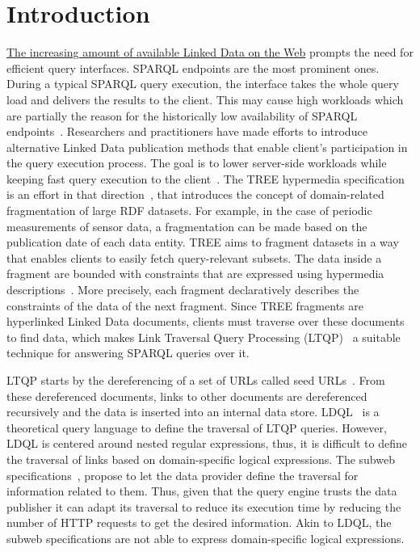 \section{Introduction}



\href{https://lod-cloud.net/#diagram}{The increasing amount of available Linked Data on the Web} prompts the need for efficient query interfaces.
SPARQL endpoints are the most prominent ones.
During a typical SPARQL query execution, the interface takes the whole query load and delivers the results to the client.
This may cause high workloads which are partially the reason for the historically low availability of SPARQL endpoints~\cite{aranda2013}.
Researchers and practitioners have made efforts to introduce alternative Linked Data publication methods that enable client's participation in the query execution process.
The goal is to lower server-side workloads while keeping fast query execution to the client~\cite{Azzam2021}.
The TREE hypermedia specification is an effort in that direction~\cite{ColpaertMaterializedTREE, lancker2021LDS}, that introduces the concept of domain-related fragmentation of large RDF datasets.
For example, in the case of periodic measurements of sensor data, a fragmentation can be made based on the publication date of each data entity.
TREE aims to fragment datasets in a way that enables clients to easily fetch query-relevant subsets.
The data inside a fragment are bounded with constraints that are expressed using hypermedia descriptions~\cite{thomasFieldingPhdThesis}.
More precisely, each fragment declaratively describes the constraints of the data of the next fragment.
Since TREE fragments are hyperlinked Linked Data documents,
clients must traverse over these documents to find data,
which makes Link Traversal Query Processing (LTQP)~\cite{Hartig2016} a suitable technique for answering SPARQL queries over it.

LTQP starts by the dereferencing of a set of URLs called seed URLs~\cite{Hartig2016}.
From these dereferenced documents, links to other documents are dereferenced recursively and the data is inserted into an internal data store.
LDQL~\cite{hartig2016Ldql} is a theoretical query language to define the traversal of LTQP queries.
However, LDQL is centered around nested regular expressions, thus, it is difficult to define the traversal of links based on domain-specific logical expressions.
The subweb specifications~\cite{bogaerts_rulemlrr_2021}, propose to let the data provider define the traversal for information related to them.
Thus, given that the query engine trusts the data publisher it can adapt its traversal to reduce its execution time by reducing the number of HTTP requests to get the desired information.
Akin to LDQL, the subweb specifications are not able to express domain-specific logical expressions.

